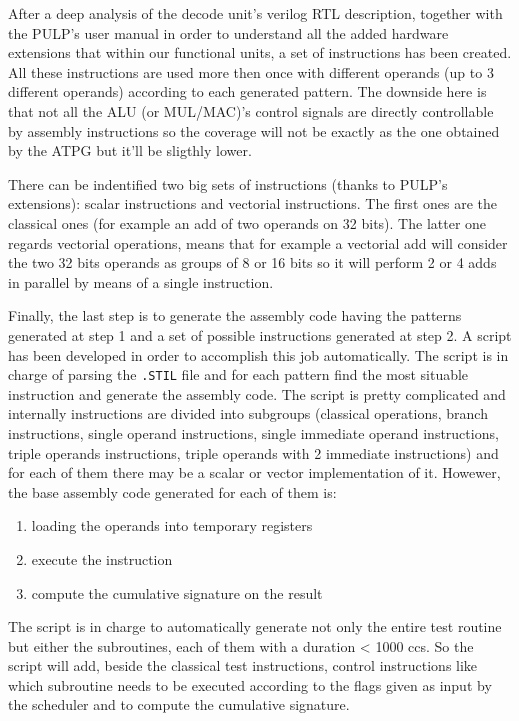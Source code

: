 \documentclass[paper=a4, fontsize=10pt]{scrartcl}	%
\begin{document}
	After a deep analysis of the decode unit's verilog RTL description, together with the PULP's user manual in order to understand all the added hardware extensions that within our functional units, a set of instructions has been created. All these instructions are used more then once with different operands (up to 3 different operands) according to each generated pattern. The downside here is that not all the ALU (or MUL/MAC)'s control signals are directly controllable by assembly instructions so the coverage will not be exactly as the one obtained by the ATPG but it'll be sligthly lower. \newline
	
	There can be indentified two big sets of instructions (thanks to PULP's extensions): scalar instructions and vectorial instructions. The first ones are the classical ones (for example an add of two operands on 32 bits). The latter one regards vectorial operations, means that for example a vectorial add will consider the two 32 bits operands as groups of 8 or 16 bits so it will perform 2 or 4 adds in parallel by means of a single instruction. \newline

	Finally, the last step is to generate the assembly code having the patterns generated at step 1 and a set of possible instructions generated at step 2. A script has been developed in order to accomplish this job automatically. The script is in charge of parsing the \texttt{.STIL} file and for each pattern find the most situable instruction and generate the assembly code. The script is pretty complicated and internally instructions are divided into subgroups (classical operations, branch instructions, single operand instructions, single immediate operand instructions, triple operands instructions, triple operands with 2 immediate instructions) and for each of them there may be a scalar or vector implementation of it. Howewer, the base assembly code generated for each of them is:
	\begin{enumerate}
		\itemsep0sp
		\item loading the operands into temporary registers
		\item execute the instruction
		\item compute the cumulative signature on the result
	\end{enumerate}

	The script is in charge to automatically generate not only the entire test routine but either the subroutines, each of them with a duration < 1000 ccs. So the script will add, beside the classical test instructions, control instructions like which subroutine needs to be executed according to the flags given as input by the scheduler and to compute the cumulative signature.
\end{document}
